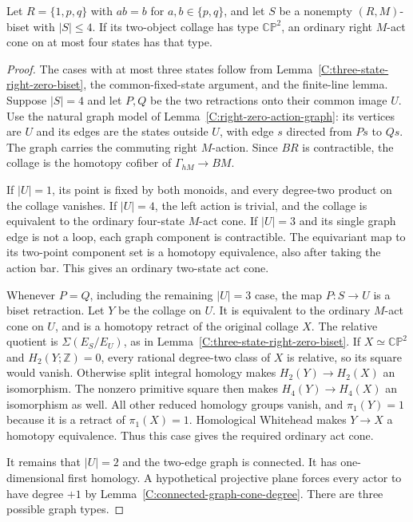 \begin{theorem}
\label{C:right-zero-four-state-reduction}
Let $R=\{1,p,q\}$ with $ab=b$ for $a,b\in\{p,q\}$, and
let $S$ be a nonempty $(R,M)$-biset with $|S|\leq4$.
If its two-object collage has type $\mathbb{CP}^2$, an ordinary
right $M$-act cone on at most four states has that type.
\end{theorem}
\begin{proof}
The cases with at most three states follow from
Lemma~\ref{C:three-state-right-zero-biset}, the common-fixed-state
argument, and the finite-line lemma.  Suppose $|S|=4$ and let
$P,Q$ be the two retractions onto their common image $U$.
Use the natural graph model of
Lemma~\ref{C:right-zero-action-graph}: its vertices are $U$ and
its edges are the states outside $U$, with edge $s$ directed
from $Ps$ to $Qs$.  The graph carries the commuting right
$M$-action.  Since $BR$ is contractible, the collage is the
homotopy cofiber of $\Gamma_{hM}\to BM$.

If $|U|=1$, its point is fixed by both monoids, and every
degree-two product on the collage vanishes.  If $|U|=4$, the
left action is trivial, and the collage is equivalent to the
ordinary four-state $M$-act cone.
If $|U|=3$ and its single graph edge is not a loop, each graph
component is contractible.  The equivariant map to its two-point
component set is a homotopy equivalence, also after taking the
action bar.  This gives an ordinary two-state act cone.

Whenever $P=Q$, including the remaining $|U|=3$ case, the map
$P:S\to U$ is a biset retraction.  Let $Y$ be the collage on
$U$.  It is equivalent to the ordinary $M$-act cone on $U$,
and is a homotopy retract of the original collage $X$.
The relative quotient is $\Sigma(E_S/E_U)$, as in
Lemma~\ref{C:three-state-right-zero-biset}.
If $X\simeq\mathbb{CP}^2$ and $H_2(Y;\mathbb Z)=0$, every
rational degree-two class of $X$ is relative, so its square
would vanish.  Otherwise split integral homology makes
$H_2(Y)\to H_2(X)$ an isomorphism.  The nonzero primitive square
then makes $H_4(Y)\to H_4(X)$ an isomorphism as well.
All other reduced homology groups vanish, and $\pi_1(Y)=1$
because it is a retract of $\pi_1(X)=1$.  Homological Whitehead
makes $Y\to X$ a homotopy equivalence.  Thus this case gives
the required ordinary act cone.

It remains that $|U|=2$ and the two-edge graph is connected.
It has one-dimensional first homology.  A hypothetical
projective plane forces every actor to have degree $+1$ by
Lemma~\ref{C:connected-graph-cone-degree}.
There are three possible graph types.


\end{proof}
